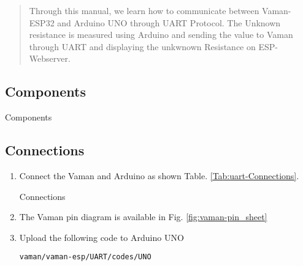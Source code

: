 \begin{abstract}
Through this manual, we learn how to communicate between Vaman-ESP32 and Arduino UNO through UART Protocol. The Unknown resistance is measured using Arduino and sending the value to Vaman through UART and displaying the unkwnown Resistance on ESP-Webserver.
\end{abstract}
\subsection{Components}


\begin{table}[!h]
\centering

\caption{Components}
\label{table:uart-components}
\end{table}

\subsection{Connections}
\begin{enumerate}[label=\thesection.\arabic*.,ref=\thesection.\theenumi]

	

\item
Connect the Vaman and Arduino as shown Table. \ref{Tab:uart-Connections}.

%
\begin{table}[!ht]
\centering

\caption{Connections}
\label{Tab:uart-Connections}
\end{table}
\item
The Vaman pin diagram is available in Fig. \ref{fig:vaman-pin_sheet}

\item Upload the following code to Arduino UNO

\begin{lstlisting}
vaman/vaman-esp/UART/codes/UNO
\end{lstlisting}
\end{enumerate}
